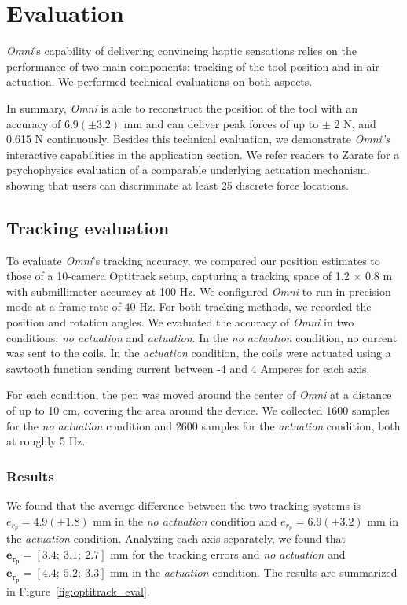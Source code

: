 \section{Evaluation}
\textit{Omni}'s capability of delivering convincing haptic sensations relies on the performance of two main components: tracking of the tool position and in-air actuation.
We performed technical evaluations on both aspects.

In summary, \textit{Omni} is able to reconstruct the position of the tool with an accuracy of $6.9 (\pm 3.2)$ mm and can deliver peak forces of up to $\pm$ 2 N, and 0.615 N continuously.
Besides this technical evaluation, we demonstrate \textit{Omni's} interactive capabilities in the application section.  We refer readers to Zarate \etal\cite{zarate2020contact} for a psychophysics evaluation of a comparable underlying actuation mechanism, showing that users can discriminate at least 25 discrete force locations.

\subsection{Tracking evaluation}
To evaluate \textit{Omni}'s tracking accuracy, we compared our position estimates to those of a 10-camera Optitrack setup, capturing a tracking space of 1.2 $\times$ 0.8 m with submillimeter accuracy at 100 Hz. We configured \textit{Omni} to run in precision mode at a frame rate of 40 Hz. For both tracking methods, we recorded the position and rotation angles.
We evaluated the accuracy of \textit{Omni} in two conditions: \emph{no actuation} and \emph{actuation}. In the \emph{no actuation} condition, no current was sent to the coils. In the \emph{actuation} condition, the coils were actuated using a sawtooth function sending current between -4 and 4 Amperes for each axis. 

For each condition, the pen was moved around the center of \textit{Omni} at a distance of up to 10 cm, covering the area around the device. We collected 1600 samples for the \emph{no actuation} condition and 2600 samples for the \emph{actuation} condition, both at roughly 5 Hz.

\subsubsection{Results}
We found that the average difference between the two tracking systems is $e_{r_p} = 4.9 (\pm 1.8)$ mm in the \emph{no actuation} condition and $e_{r_p} = 6.9 (\pm 3.2)$ mm in the \emph{actuation} condition. Analyzing each axis separately, we found that $\mathbf{e_{r_p}} = [3.4;\ 3.1;\ 2.7]$ mm for the tracking errors and \emph{no actuation} and $\mathbf{e_{r_p}} = [4.4;\ 5.2;\ 3.3]$ mm in the \emph{actuation} condition. The results are summarized in Figure~\ref{fig:optitrack_eval}.

